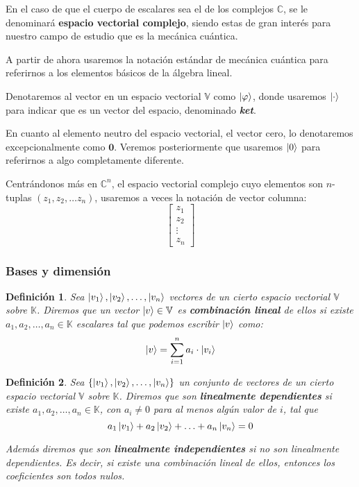 \documentclass[a4paper]{article}
\newtheorem{deff}{Definición}[section]
\numberwithin{equation}{section}
\begin{document}
En el caso de que el cuerpo de escalares sea el de los complejos $\mathbb{C}$, se le denominará \textbf{espacio vectorial complejo}, siendo estas de gran interés para nuestro campo de estudio que es la mecánica cuántica.

A partir de ahora usaremos la notación estándar de mecánica cuántica para referirnos a los elementos básicos de la álgebra lineal.

Denotaremos al vector en un espacio vectorial $\mathbb{V}$ como $\ket{\varphi}$, donde usaremos $\ket{\cdot}$ para indicar que es un vector del espacio, denominado \textbf{\textit{ket}}.

En cuanto al elemento neutro del espacio vectorial, el vector cero, lo denotaremos excepcionalmente como $\mathbf{0}$. Veremos posteriormente que usaremos $\ket{0}$ para referirnos a algo completamente diferente.

Centrándonos más en $\mathbb{C}^n$, el espacio vectorial complejo cuyo elementos son $n$-tuplas $(z_1, z_2, \ldots z_n)$, usaremos a veces la notación de vector columna:
$$\begin{bmatrix}
z_1 \\ z_2 \\ \vdots \\ z_n
\end{bmatrix}$$
\subsubsection{Bases y dimensión}

\begin{deff} Sea $\ket{v_1},\ket{v_2}, \ldots, \ket{v_n}$ vectores de un cierto espacio vectorial $\mathbb{V}$ sobre $\mathbb{K}$. Diremos que un vector $\ket{v}\in\mathbb{V}$ es \textbf{combinación lineal} de ellos si existe $a_1, a_2, \ldots, a_n \in \mathbb{K}$ escalares tal que podemos escribir $\ket{v}$ como:
\begin{equation}
\ket{v} = \sum_{i=1}^n a_i \cdot \ket{v_i}
\end{equation}
\end{deff}

\begin{deff} Sea $\{ \ket{v_1},\ket{v_2}, \ldots, \ket{v_n} \}$ un conjunto de vectores de un cierto espacio vectorial $\mathbb{V}$ sobre $\mathbb{K}$. Diremos que son \textbf{linealmente dependientes} si existe $a_1, a_2, \ldots, a_n \in \mathbb{K}$, con $a_i \neq 0$ para al menos algún valor de $i$, tal que
\begin{equation}
a_1\ket{v_1} + a_2\ket{v_2} + \ldots + a_n\ket{v_n} = 0
\end{equation}

Además diremos que son \textbf{linealmente independientes} si no son linealmente dependientes. Es decir, si existe una combinación lineal de ellos, entonces los coeficientes son todos nulos.
\end{deff}
\end{document}
